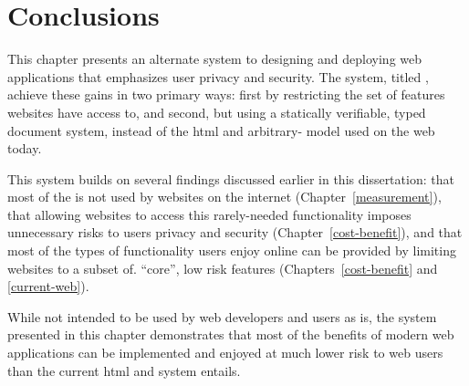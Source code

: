 \section{Conclusions}
\label{future-web:conclusions}
This chapter presents an alternate system to designing and deploying web
applications that emphasizes user privacy and security.  The system, titled
\CDF, achieve these gains in two primary ways: first by restricting the set of
\WAPI features websites have access to, and second, but using a statically
verifiable, typed document system, instead of the \gls{html} and arbitrary-\JS
model used on the web today.

This system builds on several findings discussed earlier in this dissertation:
that most of the \WAPI is not used by websites on the internet
(Chapter~\ref{measurement}), that allowing websites to access this
rarely-needed functionality imposes unnecessary risks to users privacy and
security  (Chapter~\ref{cost-benefit}), and that most of the types of
functionality users enjoy online can be provided by limiting websites to a
subset of.  ``core'', low risk \WAPI features (Chapters~\ref{cost-benefit} and
\ref{current-web}).

While not intended to be used by web developers and users as is, the \CDF
system presented in this chapter demonstrates that most of the benefits of
modern web applications can be implemented and enjoyed at much lower risk to
web users than the current \gls{html} and \JS system entails.
